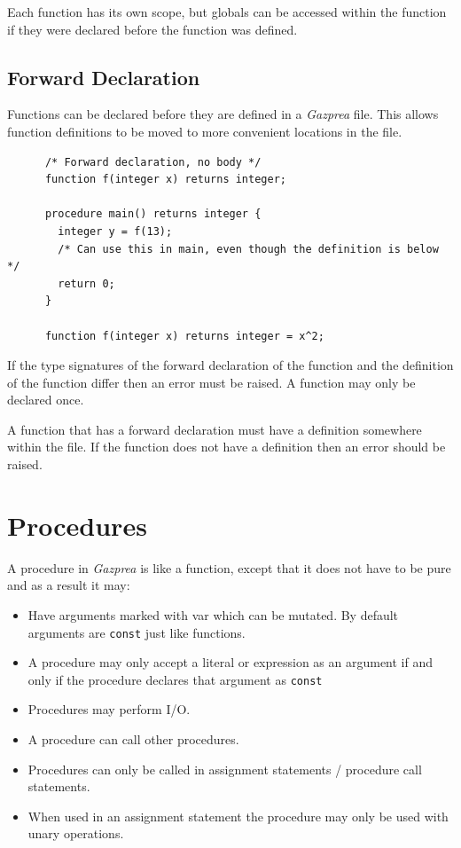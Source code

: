 \documentclass{article}
\begin{document}
    Each function has its own scope, but globals can be accessed within the function if they were declared before
    the function was defined.

  \subsection{Forward Declaration}

    Functions can be declared before they are defined in a \textit{Gazprea} file.  This allows function definitions
    to be moved to more convenient locations in the file.

    \begin{lstlisting}
      /* Forward declaration, no body */
      function f(integer x) returns integer;

      procedure main() returns integer {
        integer y = f(13);
        /* Can use this in main, even though the definition is below */
        return 0;
      }

      function f(integer x) returns integer = x^2;
    \end{lstlisting}


    If the type signatures of the forward declaration of the function and the definition of the function differ then
    an error must be raised. A function may only be declared once.

    A function that has a forward declaration must have a definition somewhere within the file. If the function does
    not have a definition then an error should be raised.


\section{Procedures}\label{sec:procedure}

  A procedure in \textit{Gazprea} is like a function, except that it does not have to be pure and as a result it may:

  \begin{itemize}
    \item Have arguments marked with var which can be mutated. By default arguments are \texttt{const} just like
    functions.
    \item A procedure may only accept a literal or expression as an argument if and only if the procedure declares
    that argument as \texttt{const}
    \item Procedures may perform I/O.
    \item A procedure can call other procedures.
    \item Procedures can only be called in assignment statements / procedure call statements.
    \item When used in an assignment statement the procedure may only be used with unary operations.
  \end{itemize}
\end{document}
